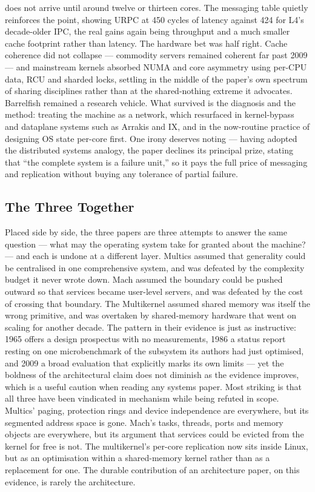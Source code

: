 does not arrive until around twelve or thirteen cores. The messaging table quietly reinforces
the point, showing URPC at 450 cycles of latency against 424 for L4's decade-older IPC, the
real gains again being throughput and a much smaller cache footprint rather than latency. The hardware bet was half right. Cache
coherence did not collapse --- commodity servers remained coherent far past 2009 --- and
mainstream kernels absorbed NUMA and core asymmetry using per-CPU data, RCU and sharded
locks, settling in the middle of the paper's own spectrum of sharing disciplines rather than
at the shared-nothing extreme it advocates. Barrelfish remained a research vehicle. What
survived is the diagnosis and the method: treating the machine as a network, which resurfaced
in kernel-bypass and dataplane systems such as Arrakis and IX, and in the now-routine practice
of designing OS state per-core first. One irony deserves noting --- having adopted the
distributed systems analogy, the paper declines its principal prize, stating that ``the
complete system is a failure unit,'' so it pays the full price of messaging and replication
without buying any tolerance of partial failure.

\subsection*{The Three Together}
\label{p4:sec:together}

Placed side by side, the three papers are three attempts to answer the same question --- what
may the operating system take for granted about the machine? --- and each is undone at a
different layer. Multics assumed that generality could be centralised in one comprehensive
system, and was defeated by the complexity budget it never wrote down. Mach assumed the
boundary could be pushed outward so that services became user-level servers, and was defeated
by the cost of crossing that boundary. The Multikernel assumed shared memory was itself the
wrong primitive, and was overtaken by shared-memory hardware that went on scaling for another
decade. The pattern in their evidence is just as instructive: 1965 offers a design prospectus
with no measurements, 1986 a status report resting on one microbenchmark of the subsystem its
authors had just optimised, and 2009 a broad evaluation that explicitly marks its own limits
--- yet the boldness of the architectural claim does not diminish as the evidence improves,
which is a useful caution when reading any systems paper. Most striking is that all three
have been vindicated in mechanism while being refuted in scope. Multics' paging, protection
rings and device independence are everywhere, but its segmented address space is gone. Mach's
tasks, threads, ports and memory objects are everywhere, but its argument that services could
be evicted from the kernel for free is not. The multikernel's per-core replication now sits
inside Linux, but as an optimisation within a shared-memory kernel rather than as a
replacement for one. The durable contribution of an architecture paper, on this evidence, is
rarely the architecture.

